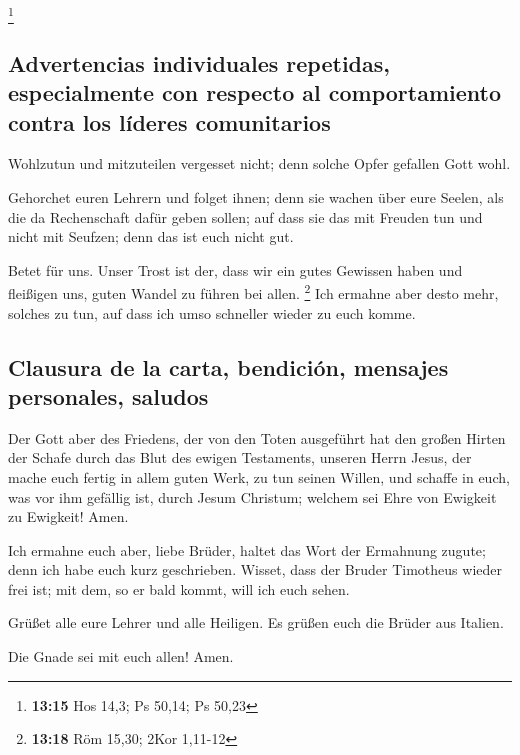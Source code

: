 \footnote{\textbf{13:15} Hos 14,3; Ps 50,14; Ps 50,23}

\hypertarget{advertencias-individuales-repetidas-especialmente-con-respecto-al-comportamiento-contra-los-luxedderes-comunitarios}{%
\subsection{Advertencias individuales repetidas, especialmente con
respecto al comportamiento contra los líderes
comunitarios}\label{advertencias-individuales-repetidas-especialmente-con-respecto-al-comportamiento-contra-los-luxedderes-comunitarios}}

 Wohlzutun und mitzuteilen vergesset nicht; denn solche
Opfer gefallen Gott wohl.

 Gehorchet euren Lehrern und folget ihnen; denn sie
wachen über eure Seelen, als die da Rechenschaft dafür geben sollen; auf
dass sie das mit Freuden tun und nicht mit Seufzen; denn das ist euch
nicht gut.

 Betet für uns. Unser Trost ist der, dass wir ein gutes
Gewissen haben und fleißigen uns, guten Wandel zu führen bei allen.
\footnote{\textbf{13:18} Röm 15,30; 2Kor 1,11-12}  Ich
ermahne aber desto mehr, solches zu tun, auf dass ich umso schneller
wieder zu euch komme.

\hypertarget{clausura-de-la-carta-bendiciuxf3n-mensajes-personales-saludos}{%
\subsection{Clausura de la carta, bendición, mensajes personales,
saludos}\label{clausura-de-la-carta-bendiciuxf3n-mensajes-personales-saludos}}

 Der Gott aber des Friedens, der von den Toten ausgeführt
hat den großen Hirten der Schafe durch das Blut des ewigen Testaments,
unseren Herrn Jesus,  der mache euch fertig in allem
guten Werk, zu tun seinen Willen, und schaffe in euch, was vor ihm
gefällig ist, durch Jesum Christum; welchem sei Ehre von Ewigkeit zu
Ewigkeit! Amen.

 Ich ermahne euch aber, liebe Brüder, haltet das Wort der
Ermahnung zugute; denn ich habe euch kurz geschrieben. 
Wisset, dass der Bruder Timotheus wieder frei ist; mit dem, so er bald
kommt, will ich euch sehen.

 Grüßet alle eure Lehrer und alle Heiligen. Es grüßen
euch die Brüder aus Italien.

 Die Gnade sei mit euch allen! Amen.
